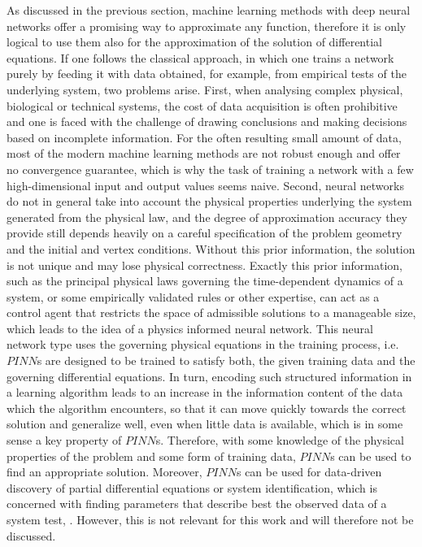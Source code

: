As discussed in the previous section, machine learning methods with deep neural networks offer a promising way to approximate any function, therefore it is only logical to use them also for the approximation of the solution of differential equations. If one follows the classical approach, in which one trains a network purely by feeding it with data obtained, for example, from empirical tests of the underlying system, two problems arise. First, when analysing complex physical, biological or technical systems, the cost of data acquisition is often prohibitive and one is faced with the challenge of drawing conclusions and making decisions based on incomplete information. For the often resulting small amount of data, most of the modern machine learning methods are not robust enough and offer no convergence guarantee, which is why the task of training a network with a few high-dimensional input and output values seems naive. Second, neural networks do not in general take into account the physical properties underlying the system generated from the physical law, and the degree of approximation accuracy they provide still depends heavily on a careful specification of the problem geometry and the initial and vertex conditions. Without this prior information, the solution is not unique and may lose physical correctness. Exactly this prior information, such as the principal physical laws governing the time-dependent dynamics of a system, or some empirically validated rules or other expertise, can act as a control agent that restricts the space of admissible solutions to a manageable size, which leads to the idea of a physics informed neural network. This neural network type uses the governing physical equations in the training process, i.e. $PINN$s are designed to be trained to satisfy both, the given training data and the governing differential equations. In turn, encoding such structured information in a learning algorithm leads to an increase in the information content of the data which the algorithm encounters, so that it can move quickly towards the correct solution and generalize well, even when little data is available, which is in some sense a key property of $PINN$s. Therefore, with some knowledge of the physical properties of the problem and some form of training data, $PINN$s can be used to find an appropriate solution. Moreover, $PINN$s can be used for data-driven discovery of partial differential equations or system identification, which is concerned with finding parameters that describe best the observed data of a system test, \cite[pp.~1-2]{RaissiPerdikarisKarniadakisPart1:2017}. However, this is not relevant for this work and will therefore not be discussed. \\
